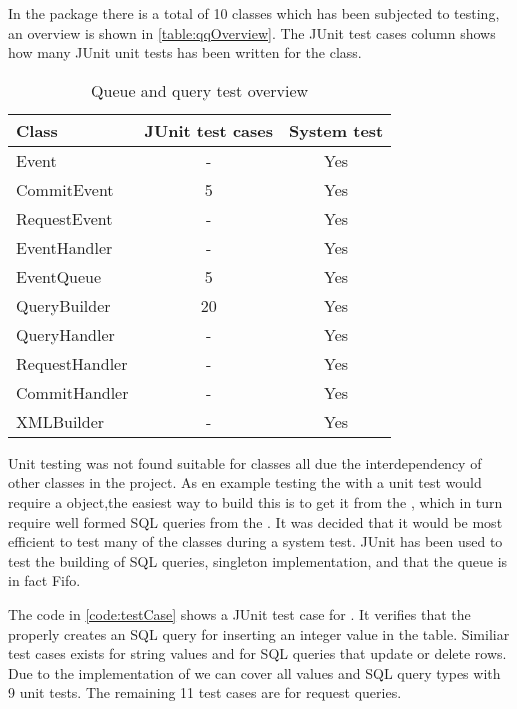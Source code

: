 In the  package there is a total of 10 classes which has been subjected to testing, an overview is shown in \autoref{table:qqOverview}.
The JUnit test cases column shows how many JUnit unit tests has been written for the class.

\begin{table}[H]
  \begin{center}
  \begin{tabular}{l|c|c}
    Class          & JUnit test cases & System test\\
\hline
    Event          & -                &Yes\\
    CommitEvent    & 5                &Yes\\
    RequestEvent   & -                &Yes\\
    EventHandler   & -                &Yes\\
    EventQueue     & 5                &Yes\\
    QueryBuilder   & 20               &Yes\\
    QueryHandler   & -                &Yes\\
    RequestHandler & -                &Yes\\
    CommitHandler  & -                &Yes\\
    XMLBuilder     & -                &Yes\\
  \end{tabular}
  \caption{Queue and query test overview}
  \label{table:qqOverview}
  \end{center}
\end{table}

Unit testing was not found suitable for classes all due the interdependency of other classes in the project. As en example testing the  with a unit test would require
a  object,the easiest way to build this is to get it from the , which in turn require well formed SQL queries from the .
It was decided that it would be most efficient to test many of the classes during a system test. JUnit has been used to test the building of SQL queries, singleton implementation,
and that the queue is in fact Fifo. 

The code in \autoref{code:testCase} shows a JUnit test case for . It verifies that the  properly creates an SQL query for inserting an integer value
in the  table. Similiar test cases exists for string values and for SQL queries that update or delete rows.
Due to the implementation of  we can cover all values and SQL query types with 9 unit tests. The remaining 11 test cases are for request queries.

